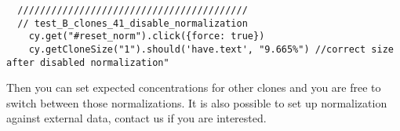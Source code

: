 \begin{verbatim}
  /////////////////////////////////////////
  // test_B_clones_41_disable_normalization
    cy.get("#reset_norm").click({force: true})
    cy.getCloneSize("1").should('have.text', "9.665%") //correct size after disabled normalization"

\end{verbatim}

Then you can set expected concentrations for other clones and you are free to
switch between those normalizations.
It is also possible to set up normalization against external data,
contact us if you are interested.

